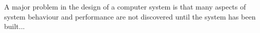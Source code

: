 \documentclass[a4paper, 12pt, openany]{book} %
\numberwithin{example}{section}
\begin{document}
  A major problem in the design of a computer system is that many aspects of system behaviour and performance are not discovered until the system has been built...  \cite{zurcherIterativeMultiLevelModeling1968}
\end{document}
